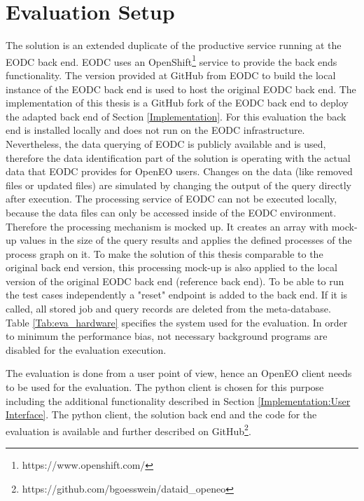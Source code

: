 \documentclass[draft,final]{vutinfth} %
\begin{document}
\section{Evaluation Setup}\label{Evaluation:Setup}
The solution is an extended duplicate of the productive service running at the EODC back end. EODC uses an OpenShift\footnote{https://www.openshift.com/} service to provide the back ends functionality. The version provided at GitHub from EODC to build the local instance of the EODC back end is used to host the original EODC back end. The implementation of this thesis is a GitHub fork of the EODC back end to deploy the adapted back end of Section \ref{Implementation}. For this evaluation the back end is installed locally and does not run on the EODC infrastructure. Nevertheless, the data querying of EODC is publicly available and is used, therefore the data identification part of the solution is operating with the actual data that EODC provides for OpenEO users. Changes on the data (like removed files or updated files) are simulated by changing the output of the query directly after execution. The processing service of EODC can not be executed locally, because the data files can only be accessed inside of the EODC environment. Therefore the processing mechanism is mocked up. It creates an array with mock-up values in the size of the query results and applies the defined processes of the process graph on it. To make the solution of this thesis comparable to the original back end version, this processing mock-up is also applied to the local version of the original EODC back end (reference back end). To be able to run the test cases independently a "reset" endpoint is added to the back end. If it is called, all stored job and query records are deleted from the meta-database. \\

Table \ref{Tab:eva_hardware} specifies the system used for the evaluation. In order to minimum the performance bias, not necessary background programs are disabled for the evaluation execution.  

The evaluation is done from a user point of view, hence an OpenEO client needs to be used for the evaluation. The python client is chosen for this purpose including the additional functionality described in Section \ref{Implementation:User Interface}. The python client, the solution back end and the code for the evaluation is available and further described on GitHub\footnote{https://github.com/bgoesswein/dataid\_openeo}. \\ 
\end{document}
